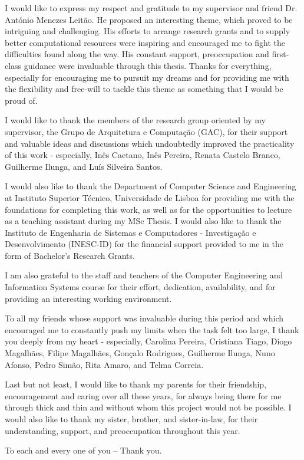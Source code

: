 
I would like to express my respect and gratitude to my supervisor and friend Dr. António Menezes Leitão. He proposed an interesting theme, which proved to be intriguing and challenging. His efforts to arrange research grants and to supply better computational resources were inspiring and encouraged me to fight the difficulties found along the way. His constant support, preoccupation and first-class guidance were invaluable through this thesis. Thanks for everything, especially for encouraging me to pursuit my dreams and for providing me with the flexibility and free-will to tackle this theme as something that I would be proud of.  

I would like to thank the members of the research group oriented by my supervisor, the Grupo de Arquitetura e Computação (GAC), for their support and valuable ideas and discussions which undoubtedly improved the practicality of this work - especially, Inês Caetano, Inês Pereira, Renata Castelo Branco, Guilherme Ilunga, and Luís Silveira Santos. 

I would also like to thank the Department of Computer Science and Engineering at Instituto Superior Técnico, Universidade de Lisboa for providing me with the foundations for completing this work, as well as for the opportunities to lecture as a teaching assistant during my MSc Thesis. I would also like to thank the Instituto de Engenharia de Sistemas e Computadores - Investigação e Desenvolvimento (INESC-ID) for the financial support provided to me in the form of Bachelor's Research Grants.

I am also grateful to the staff and teachers of the Computer Engineering and Information Systems course for their effort, dedication, availability, and for providing an interesting working environment. 

To all my friends whose support was invaluable during this period and which encouraged me to constantly push my limits when the task felt too large, I thank you deeply from my heart - especially, Carolina Pereira, Cristiana Tiago, Diogo Magalhães, Filipe Magalhães, Gonçalo Rodrigues, Guilherme Ilunga, Nuno Afonso, Pedro Simão, Rita Amaro, and Telma Correia.

Last but not least, I would like to thank my parents for their friendship, encouragement and caring over all these years, for always being there for me through thick and thin and without whom this project would not be possible. I would also like to thank my sister, brother, and sister-in-law, for their understanding, support, and preoccupation throughout this year.

To each and every one of you -- Thank you.